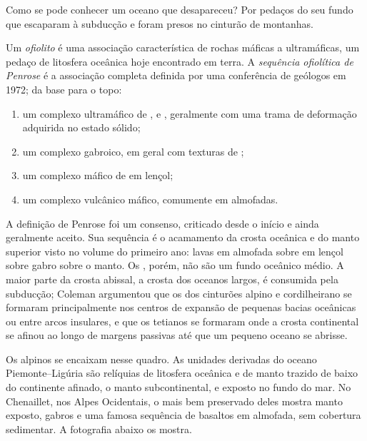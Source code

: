Como se pode conhecer um oceano que desapareceu? Por pedaços do seu fundo que escaparam à
subducção e foram presos no cinturão de montanhas.

\begin{definition}\label{def:b2:alpine-orogen:ophiolite}
Um \emph{ofiolito} é uma associação característica de rochas máficas a
ultramáficas, um pedaço de litosfera oceânica hoje encontrado em terra. A \emph{sequência ofiolítica
de Penrose} é a associação completa definida por uma
conferência de geólogos em 1972; da base para o topo:
\begin{enumerate}
\item um complexo ultramáfico de ,  e , geralmente com uma
trama de deformação adquirida no estado sólido;
\item um complexo gabroico, em geral com texturas de ;
\item um complexo máfico de  em lençol;
\item um complexo vulcânico máfico, comumente em almofadas.
\end{enumerate}
\end{definition}

A definição de Penrose foi um consenso, criticado desde o início e ainda geralmente
aceito. Sua sequência é o acamamento da crosta oceânica e do manto superior visto no volume do primeiro
ano: lavas em almofada sobre  em lençol sobre gabro sobre o manto. Os , porém, não são
um fundo oceânico médio. A maior parte da crosta abissal, a crosta dos oceanos largos, é consumida pela
subducção; Coleman argumentou que os  dos cinturões alpino e cordilheirano se formaram
principalmente nos centros de expansão de pequenas bacias oceânicas ou entre arcos insulares, e que os
tetianos se formaram onde a crosta continental se afinou ao longo de margens passivas até que um pequeno
oceano se abrisse.

Os  alpinos se encaixam nesse quadro. As unidades derivadas do oceano Piemonte--Ligúria
são relíquias de litosfera oceânica e de manto trazido de baixo do continente
afinado, o manto subcontinental, e exposto no fundo do mar. No
Chenaillet, nos Alpes Ocidentais, o mais bem preservado deles mostra manto
exposto, gabros e uma famosa sequência de basaltos em almofada, sem cobertura sedimentar.
A fotografia abaixo os mostra.

